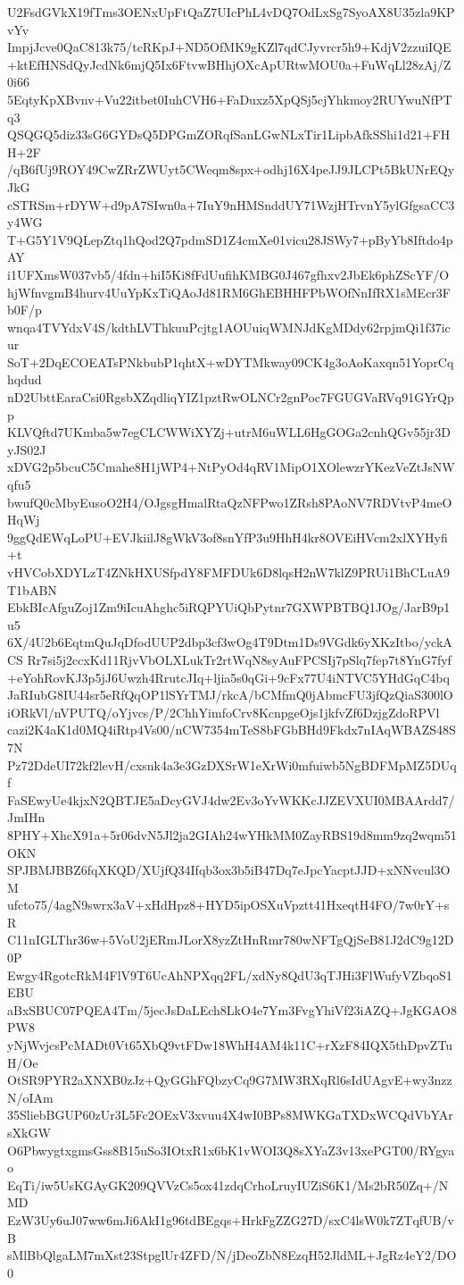 U2FsdGVkX19fTms3OENxUpFtQaZ7UIcPhL4vDQ7OdLxSg7SyoAX8U35zla9KPvYv
ImpjJcve0QaC813k75/tcRKpJ+ND5OfMK9gKZl7qdCJyvrcr5h9+KdjV2zzuiIQE
+ktEfHNSdQyJcdNk6mjQ5Ix6FtvwBHhjOXcApURtwMOU0a+FuWqLl28zAj/Z0i66
5EqtyKpXBvnv+Vu22itbet0IuhCVH6+FaDuxz5XpQSj5cjYhkmoy2RUYwuNfPTq3
QSQGQ5diz33sG6GYDsQ5DPGmZORqfSanLGwNLxTir1LipbAfkSShi1d21+FHH+2F
/qB6fUj9ROY49CwZRrZWUyt5CWeqm8spx+odhj16X4peJJ9JLCPt5BkUNrEQyJkG
cSTRSm+rDYW+d9pA7SIwn0a+7IuY9nHMSnddUY71WzjHTrvnY5ylGfgsaCC3y4WG
T+G5Y1V9QLepZtq1hQod2Q7pdmSD1Z4cmXe01vicu28JSWy7+pByYb8Iftdo4pAY
i1UFXmsW037vb5/4fdn+hiI5Ki8fFdUufihKMBG0J467gfhxv2JbEk6phZScYF/O
hjWfnvgmB4hurv4UuYpKxTiQAoJd81RM6GhEBHHFPbWOfNnIfRX1sMEcr3Fb0F/p
wnqa4TVYdxV4S/kdthLVThkuuPcjtg1AOUuiqWMNJdKgMDdy62rpjmQi1f37icur
SoT+2DqECOEATsPNkbubP1qhtX+wDYTMkway09CK4g3oAoKaxqn51YoprCqhqdud
nD2UbttEaraCsi0RgsbXZqdliqYIZ1pztRwOLNCr2gnPoc7FGUGVaRVq91GYrQpp
KLVQftd7UKmba5w7egCLCWWiXYZj+utrM6uWLL6HgGOGa2cnhQGv55jr3DyJS02J
xDVG2p5bcuC5Cmahe8H1jWP4+NtPyOd4qRV1MipO1XOlewzrYKezVeZtJsNWqfu5
bwufQ0cMbyEusoO2H4/OJgsgHmalRtaQzNFPwo1ZRsh8PAoNV7RDVtvP4meOHqWj
9ggQdEWqLoPU+EVJkiilJ8gWkV3of8snYfP3u9HhH4kr8OVEiHVcm2xlXYHyfi+t
vHVCobXDYLzT4ZNkHXUSfpdY8FMFDUk6D8lqsH2nW7klZ9PRUi1BhCLuA9T1bABN
EbkBIcAfguZoj1Zm9iIcuAhghc5iRQPYUiQbPytnr7GXWPBTBQ1JOg/JarB9p1u5
6X/4U2b6EqtmQuJqDfodUUP2dbp3cf3wOg4T9Dtm1Ds9VGdk6yXKzItbo/yckACS
Rr7si5j2ccxKd11RjvVbOLXLukTr2rtWqN8syAuFPCSIj7pSlq7fep7t8YnG7fyf
+eYohRovKJ3p5jJ6Uwzh4RrutcJIq+ljia5s0qGi+9cFx77U4iNTVC5YHdGqC4bq
JaRIubG8IU44sr5eRfQqOP1lSYrTMJ/rkcA/bCMfmQ0jAbmcFU3jfQzQiaS300lO
iORkVl/nVPUTQ/oYjvcs/P/2ChhYimfoCrv8KcnpgeOjs1jkfvZf6DzjgZdoRPVl
cazi2K4aK1d0MQ4iRtp4Vs00/nCW7354mTeS8bFGbBHd9Fkdx7nIAqWBAZS48S7N
Pz72DdeUI72kf2levH/cxsnk4a3e3GzDXSrW1eXrWi0mfuiwb5NgBDFMpMZ5DUqf
FaSEwyUe4kjxN2QBTJE5aDcyGVJ4dw2Ev3oYvWKKcJJZEVXUI0MBAArdd7/JmIHn
8PHY+XhcX91a+5r06dvN5Jl2ja2GIAh24wYHkMM0ZayRBS19d8mm9zq2wqm51OKN
SPJBMJBBZ6fqXKQD/XUjfQ34Ifqb3ox3b5iB47Dq7eJpcYacptJJD+xNNvcul3OM
ufcto75/4agN9swrx3aV+xHdHpz8+HYD5ipOSXuVpztt41HxeqtH4FO/7w0rY+sR
C11nIGLThr36w+5VoU2jERmJLorX8yzZtHnRmr780wNFTgQjSeB81J2dC9g12D0P
Ewgy4RgotcRkM4FlV9T6UcAhNPXqq2FL/xdNy8QdU3qTJHi3FlWufyVZbqoS1EBU
aBxSBUC07PQEA4Tm/5jecJsDaLEch8LkO4e7Ym3FvgYhiVf23iAZQ+JgKGAO8PW8
yNjWvjcsPcMADt0Vt65XbQ9vtFDw18WhH4AM4k11C+rXzF84IQX5thDpvZTuH/Oe
OtSR9PYR2aXNXB0zJz+QyGGhFQbzyCq9G7MW3RXqRl6sIdUAgvE+wy3nzzN/oIAm
35SliebBGUP60zUr3L5Fc2OExV3xvuu4X4wI0BPs8MWKGaTXDxWCQdVbYArsXkGW
O6PbwygtxgmsGss8B15uSo3IOtxR1x6bK1vWOI3Q8sXYaZ3v13xePGT00/RYgyao
EqTi/iw5UsKGAyGK209QVVzCs5ox41zdqCrhoLruyIUZiS6K1/Ms2bR50Zq+/NMD
EzW3Uy6uJ07ww6mJi6AkI1g96tdBEgqs+HrkFgZZG27D/sxC4lsW0k7ZTqfUB/vB
sMlBbQlgaLM7mXst23StpglUr4ZFD/N/jDeoZbN8EzqH52JldML+JgRz4eY2/DO0
